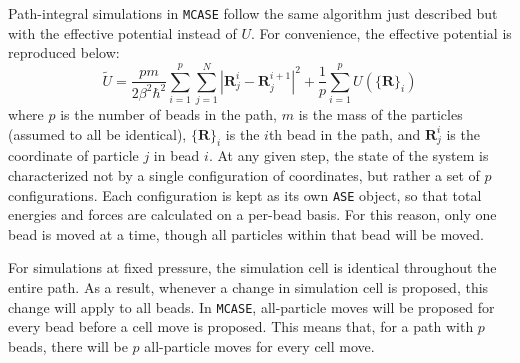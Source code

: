 \documentclass{article}
\begin{document}
Path-integral simulations in \texttt{MCASE} follow the same algorithm just described but with the effective potential instead of $U$.
For convenience, the effective potential is reproduced below:
%
\begin{equation}
    \label{eq:path_integral_potential_again}
    \tilde{U} = \frac{p m}{2 \beta^2 \hbar^2} \sum_{i=1}^p \sum_{j = 1}^N |\boldsymbol{R}_j^i - \boldsymbol{R}_j^{i+1}|^2 + \frac{1}{p} \sum_{i=1}^p U(\{\boldsymbol{R}\}_i)
\end{equation}
%
where $p$ is the number of beads in the path, $m$ is the mass of the particles (assumed to all be identical), $\{\boldsymbol{R}\}_i$ is the $i$th bead in the path, and $\boldsymbol{R}_j^i$ is the coordinate of particle $j$ in bead $i$.
At any given step, the state of the system is characterized not by a single configuration of coordinates, but rather a set of $p$ configurations.
Each configuration is kept as its own \texttt{ASE} object, so that total energies and forces are calculated on a per-bead basis.
For this reason, only one bead is moved at a time, though all particles within that bead will be moved.

For simulations at fixed pressure, the simulation cell is identical throughout the entire path.
As a result, whenever a change in simulation cell is proposed, this change will apply to all beads.
In \texttt{MCASE}, all-particle moves will be proposed for every bead before a cell move is proposed.
This means that, for a path with $p$ beads, there will be $p$ all-particle moves for every cell move.
\end{document}

